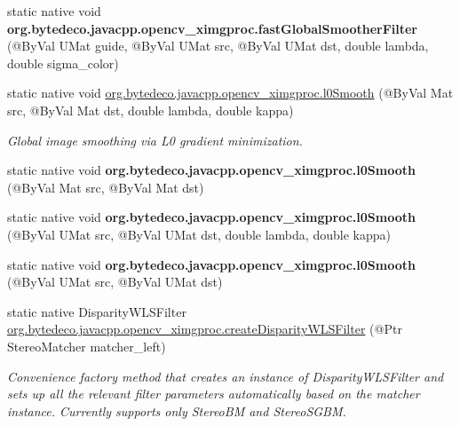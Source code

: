 \begin{DoxyCompactItemize}
\item 
\mbox{\label{group__ximgproc__filters_ga546989b317ff4d2ddbe07becd2ebbb1b}} 
static native void {\bfseries org.\+bytedeco.\+javacpp.\+opencv\+\_\+ximgproc.\+fast\+Global\+Smoother\+Filter} (@By\+Val U\+Mat guide, @By\+Val U\+Mat src, @By\+Val U\+Mat dst, double lambda, double sigma\+\_\+color)
\item 
static native void \hyperlink{group__ximgproc__filters_ga5a74b92ad3cd10d7809e4416c623610d}{org.\+bytedeco.\+javacpp.\+opencv\+\_\+ximgproc.\+l0\+Smooth} (@By\+Val Mat src, @By\+Val Mat dst, double lambda, double kappa)
\begin{DoxyCompactList}\small\item\em Global image smoothing via L0 gradient minimization. \end{DoxyCompactList}\item 
\mbox{\label{group__ximgproc__filters_ga56621a6fbf22676cf5de92edb01b83e1}} 
static native void {\bfseries org.\+bytedeco.\+javacpp.\+opencv\+\_\+ximgproc.\+l0\+Smooth} (@By\+Val Mat src, @By\+Val Mat dst)
\item 
\mbox{\label{group__ximgproc__filters_ga09d96db08208381068baf33d2ed0c4ad}} 
static native void {\bfseries org.\+bytedeco.\+javacpp.\+opencv\+\_\+ximgproc.\+l0\+Smooth} (@By\+Val U\+Mat src, @By\+Val U\+Mat dst, double lambda, double kappa)
\item 
\mbox{\label{group__ximgproc__filters_ga529fc513d981973560d86f612486432a}} 
static native void {\bfseries org.\+bytedeco.\+javacpp.\+opencv\+\_\+ximgproc.\+l0\+Smooth} (@By\+Val U\+Mat src, @By\+Val U\+Mat dst)
\item 
static native Disparity\+W\+L\+S\+Filter \hyperlink{group__ximgproc__filters_ga5282f3f5ccb08ba470cae8c4b95cee3d}{org.\+bytedeco.\+javacpp.\+opencv\+\_\+ximgproc.\+create\+Disparity\+W\+L\+S\+Filter} (@Ptr Stereo\+Matcher matcher\+\_\+left)
\begin{DoxyCompactList}\small\item\em Convenience factory method that creates an instance of Disparity\+W\+L\+S\+Filter and sets up all the relevant filter parameters automatically based on the matcher instance. Currently supports only Stereo\+BM and Stereo\+S\+G\+BM. \end{DoxyCompactList}\item 

\end{DoxyCompactItemize}
